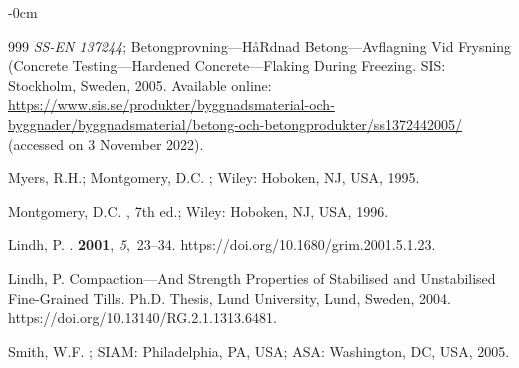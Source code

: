 \documentclass[materials,article,accept,pdftex,moreauthors]{Definitions/mdpi}
\begin{document}
\begin{adjustwidth}{-\extralength}{0cm}
\begin{thebibliography}{999}
\emph{SS-EN 137244}; Betongprovning---HåRdnad Betong---Avflagning Vid Frysning
  (Concrete Testing---Hardened Concrete---Flaking During Freezing.  {SIS:  Stockholm, Sweden}, 2005.  Available online: 
  \url{https://www.sis.se/produkter/byggnadsmaterial-och-byggnader/byggnadsmaterial/betong-och-betongprodukter/ss1372442005/}  (accessed on 3 November 2022).

Myers, R.H.; Montgomery, D.C.
; Wiley: {Hoboken, NJ, USA}, 1995.

Montgomery, D.C.
, 7th ed.; Wiley: {Hoboken, NJ, USA}, 1996.

Lindh, P.
.
 {\bf 2001}, {\em 5},~23–34. https://doi.org/10.1680/grim.2001.5.1.23.

Lindh, P.
\newblock Compaction---And Strength Properties of Stabilised and Unstabilised
  Fine-Grained Tills.
\newblock Ph.D. Thesis, Lund University, Lund, Sweden,  2004. https://doi.org/10.13140/RG.2.1.1313.6481.

Smith, W.F.
; SIAM: {Philadelphia, PA, USA}; ASA: {Washington, DC, USA,} 2005.

\end{thebibliography}


\end{adjustwidth}
\end{document}
